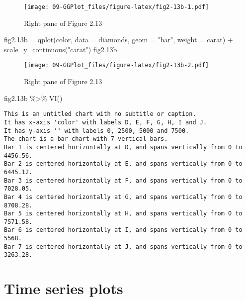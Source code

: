 \documentclass[
]{book}
\newenvironment{Shaded}{\begin{snugshade}}{\end{snugshade}}
\newcommand{\AttributeTok}[1]{\textcolor[rgb]{0.77,0.63,0.00}{#1}}
\newcommand{\FloatTok}[1]{\textcolor[rgb]{0.00,0.00,0.81}{#1}}
\newcommand{\FunctionTok}[1]{\textcolor[rgb]{0.00,0.00,0.00}{#1}}
\newcommand{\NormalTok}[1]{#1}
\newcommand{\OtherTok}[1]{\textcolor[rgb]{0.56,0.35,0.01}{#1}}
\newcommand{\SpecialCharTok}[1]{\textcolor[rgb]{0.00,0.00,0.00}{#1}}
\newcommand{\StringTok}[1]{\textcolor[rgb]{0.31,0.60,0.02}{#1}}
\begin{document}
\begin{figure}
\centering
\texttt{[image: 09-GGPlot\_files/figure-latex/fig2-13b-1.pdf]}
\caption{\label{fig:fig2-13b-1}Right pane of Figure 2.13}
\end{figure}

\begin{Shaded}
\begin{Highlighting}[]
\NormalTok{fig2}\FloatTok{.13}\NormalTok{b }\OtherTok{=} \FunctionTok{qplot}\NormalTok{(color, }\AttributeTok{data =}\NormalTok{ diamonds, }\AttributeTok{geom =} \StringTok{"bar"}\NormalTok{, }\AttributeTok{weight =}\NormalTok{ carat) }\SpecialCharTok{+} \FunctionTok{scale\_y\_continuous}\NormalTok{(}\StringTok{"carat"}\NormalTok{)    }
\NormalTok{fig2}\FloatTok{.13}\NormalTok{b}
\end{Highlighting}
\end{Shaded}

\begin{figure}
\centering
\texttt{[image: 09-GGPlot\_files/figure-latex/fig2-13b-2.pdf]}
\caption{\label{fig:fig2-13b-2}Right pane of Figure 2.13}
\end{figure}

\begin{Shaded}
\begin{Highlighting}[]
\NormalTok{fig2}\FloatTok{.13}\NormalTok{b }\SpecialCharTok{\%\textgreater{}\%} \FunctionTok{VI}\NormalTok{()   }
\end{Highlighting}
\end{Shaded}

\begin{verbatim}
This is an untitled chart with no subtitle or caption.
It has x-axis 'color' with labels D, E, F, G, H, I and J.
It has y-axis '' with labels 0, 2500, 5000 and 7500.
The chart is a bar chart with 7 vertical bars.
Bar 1 is centered horizontally at D, and spans vertically from 0 to 4456.56.
Bar 2 is centered horizontally at E, and spans vertically from 0 to 6445.12.
Bar 3 is centered horizontally at F, and spans vertically from 0 to 7028.05.
Bar 4 is centered horizontally at G, and spans vertically from 0 to 8708.28.
Bar 5 is centered horizontally at H, and spans vertically from 0 to 7571.58.
Bar 6 is centered horizontally at I, and spans vertically from 0 to 5568.
Bar 7 is centered horizontally at J, and spans vertically from 0 to 3263.28.
\end{verbatim}

\hypertarget{time-series-plots}{%
\section{Time series plots}\label{time-series-plots}}
\end{document}
